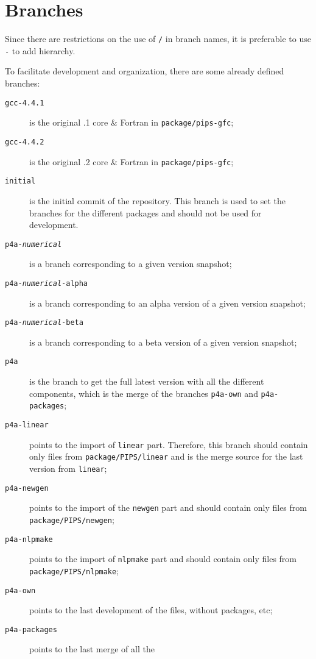 \documentclass[a4paper]{article}
\begin{document}
\section{Branches}
\label{sec:branches}

Since there are restrictions on the use of \texttt{/} in branch names,
it is preferable to use \texttt{-} to add hierarchy.

To facilitate development and organization, there are some already
defined branches:
\begin{description}
\item[\texttt{gcc-4.4.1}] is the original .1 core \& Fortran in
  \texttt{package/pips-gfc};
\item[\texttt{gcc-4.4.2}] is the original .2 core \& Fortran in
  \texttt{package/pips-gfc};
\item[\texttt{initial}] is the initial commit of the \Apfa
  repository. This branch is used
  to set the branches for the different packages and should not
  be used for development.
\item[\texttt{p4a-\emph{numerical}}] is a branch corresponding to a
  given version snapshot;
\item[\texttt{p4a-\emph{numerical}-alpha}] is a branch corresponding
  to an alpha version of a given version snapshot;
\item[\texttt{p4a-\emph{numerical}-beta}] is a branch corresponding to a beta
  version of a given version snapshot;
\item[\texttt{p4a}] is the branch to get the full latest \Apfa version
  with all the different components, which is the merge of the branches
  \texttt{p4a-own} and \texttt{p4a-packages};
\item[\texttt{p4a-linear}] points to the import of \Apips \texttt{linear}
  part. Therefore, this branch should contain only files from
  \texttt{package/PIPS/linear} and is the merge source for
  the last version from \texttt{linear};
\item[\texttt{p4a-newgen}] points to the import of the \Apips \texttt{newgen}
  part and should contain only files from
  \texttt{package/PIPS/newgen};
\item[\texttt{p4a-nlpmake}] points to the import of \Apips \texttt{nlpmake}
  part and should contain only files from
  \texttt{package/PIPS/nlpmake};
\item[\texttt{p4a-own}] points to the last development of the \Apfa files,
  without packages, etc;
\item[\texttt{p4a-packages}] points to the last merge of all the \Apfa

\end{description}
\end{document}
